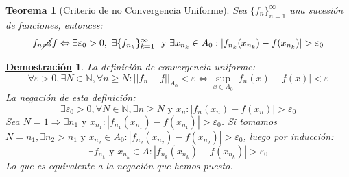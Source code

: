 \documentclass[10pt,a4paper,openright]{book}
\theoremstyle{break}
\newtheorem{theo}{Teorema}[chapter]
\newtheorem*{demo}{\underline{Demostración}}
\begin{document}
\begin{theo}[Criterio de no Convergencia Uniforme]
Sea $\{f_n\}_{n=1}^\infty$ una sucesión de funciones, entonces:
$$f_n\cancel{\rightrightarrows} f \Leftrightarrow \exists \varepsilon_0 > 0, \ \exists \{f_{n_k}\}_{k=1}^\infty\  \mbox{ y } \exists x_{n_k} \in A_0: |f_{n_k} (x_{n_k}) - f(x_{n_k}) | > \varepsilon_0$$
\end{theo}
\begin{demo}
La definición de convergencia uniforme:
$$\forall \varepsilon > 0, \exists N \in \mathbb{N}, \forall n \geq N : ||f_n - f||_{A_0} < \varepsilon \Leftrightarrow \underset{x \in A_0}{\sup} |f_n(x) - f(x)| < \varepsilon$$
La negación de esta definición:
$$\exists \varepsilon_0 > 0, \forall N \in \mathbb{N},  \exists n \geq N  \mbox{ y } x_n: |f_n(x_n) - f(x_n)| > \varepsilon_0$$
Sea $N = 1 \Rightarrow \exists n_1 \mbox{ y } x_{n_1} :  |f_{n_1} (x_{n_1}) - f(x_{n_1})| > \varepsilon_0$. Si tomamos $N=n_1, \exists n_2 > n_1 \mbox{ y } x_{n_2} \in A_0 : |f_{n_2} (x_{n_2}) - f(x_{n_2})| > \varepsilon_0$, luego por inducción:
$$\exists f_{n_k} \mbox{ y } x_{n_k}\in A : |f_{n_k} (x_{n_k}) - f(x_{n_k})| > \varepsilon_0$$
Lo que es equivalente a la negación que hemos puesto.
\end{demo}
\end{document}
